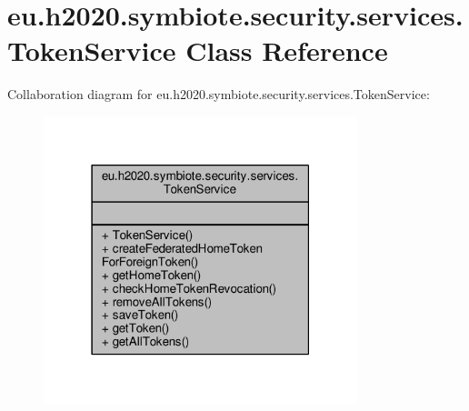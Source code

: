 \hypertarget{classeu_1_1h2020_1_1symbiote_1_1security_1_1services_1_1TokenService}{}\section{eu.\+h2020.\+symbiote.\+security.\+services.\+Token\+Service Class Reference}
\label{classeu_1_1h2020_1_1symbiote_1_1security_1_1services_1_1TokenService}


Collaboration diagram for eu.\+h2020.\+symbiote.\+security.\+services.\+Token\+Service\+:
\nopagebreak
\begin{figure}[H]
\begin{center}
\leavevmode
\includegraphics[width=259pt]{classeu_1_1h2020_1_1symbiote_1_1security_1_1services_1_1TokenService__coll__graph}
\end{center}
\end{figure}
